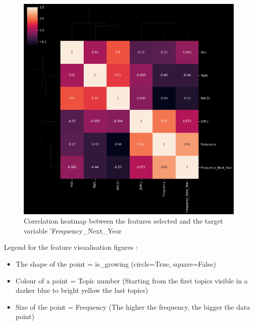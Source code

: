\documentclass[12pt,MSc,a4paper,oneside]{muthesis}
\begin{document}
\begin{figure}[h]
    \centering
    \includegraphics[scale=0.5]{test_corelatie.png}
    \caption{Correlation heatmap between the features selected and the target variable 'Frequency\_Next\_Year}
\end{figure}

\newpage

Legend for the feature visualisation figures : 
\begin{itemize}
    \item The shape of the point = is\_growing (circle=True, square=False)
    \item Colour of a point = Topic number (Starting from the first topics visible in a darker blue to bright yellow the last topics)
    \item Size of the point = Frequency (The higher the frequency, the bigger the data point)
\end{itemize}
\end{document}
